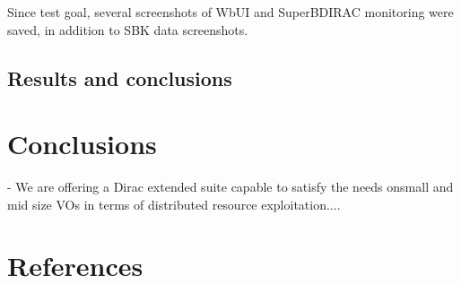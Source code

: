 \documentclass[a4paper]{jpconf}
\begin{document}
Since test goal, several screenshots of WbUI and SuperBDIRAC monitoring were saved, in addition to SBK data screenshots.

\subsection{Results and conclusions}

\section{Conclusions}

- We are offering a Dirac extended suite capable to satisfy the
needs onsmall and mid size VOs in terms of distributed
resource exploitation....



\section*{References}
\end{document}
